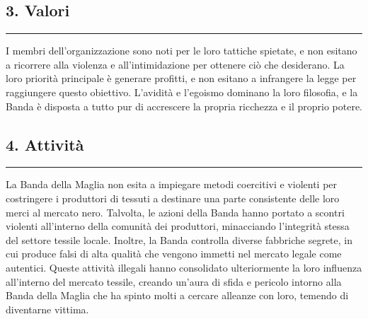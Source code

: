 \subsection{3. Valori}\label{valori}

\begin{center}\rule{0.5\linewidth}{0.5pt}\end{center}

I membri dell'organizzazione sono noti per le loro tattiche spietate, e
non esitano a ricorrere alla violenza e all'intimidazione per ottenere
ciò che desiderano. La loro priorità principale è generare profitti, e
non esitano a infrangere la legge per raggiungere questo obiettivo.
L'avidità e l'egoismo dominano la loro filosofia, e la Banda è disposta
a tutto pur di accrescere la propria ricchezza e il proprio potere.

\subsection{4. Attività}\label{attivituxe0}

\begin{center}\rule{0.5\linewidth}{0.5pt}\end{center}

La Banda della Maglia non esita a impiegare metodi coercitivi e violenti
per costringere i produttori di tessuti a destinare una parte
consistente delle loro merci al mercato nero. Talvolta, le azioni della
Banda hanno portato a scontri violenti all'interno della comunità dei
produttori, minacciando l'integrità stessa del settore tessile locale.
Inoltre, la Banda controlla diverse fabbriche segrete, in cui produce
falsi di alta qualità che vengono immetti nel mercato legale come
autentici. Queste attività illegali hanno consolidato ulteriormente la
loro influenza all'interno del mercato tessile, creando un'aura di sfida
e pericolo intorno alla Banda della Maglia che ha spinto molti a cercare
alleanze con loro, temendo di diventarne vittima.
